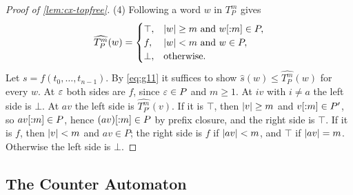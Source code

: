 \begin{proof}[Proof of \cref{lem:cx-topfree}]
(4) Following a word $w$ in $T_P^m$ gives
\[
 \widehat{T_P^m}(w)=
 \begin{cases}
 \top,&\lvert w\rvert\ge m\text{ and }w[{:}m]\in P,\\
 f,&\lvert w\rvert<m\text{ and }w\in P,\\
 \bot,&\text{otherwise}.
 \end{cases}
\]
Let $s=f(t_0,\ldots,t_{n-1})$. By \eqref{eq:g11} it suffices to show
$\widehat s(w)\le\widehat{T_P^m}(w)$ for every $w$. At $\varepsilon$ both sides are
$f$, since $\varepsilon\in P$ and $m\ge1$. At $iv$ with $i\ne a$ the left side is
$\bot$. At $av$ the left side is $\widehat{T_{P'}^m}(v)$. If it is $\top$, then
$\lvert v\rvert\ge m$ and $v[{:}m]\in P'$, so $av[{:}m]\in P$, hence
$(av)[{:}m]\in P$ by prefix closure, and the right side is $\top$. If it is
$f$, then $\lvert v\rvert<m$ and $av\in P$; the right side is $f$ if $\lvert av\rvert<m$, and
$\top$ if $\lvert av\rvert=m$. Otherwise the left side is $\bot$.
\end{proof}

\subsection{The Counter Automaton}

